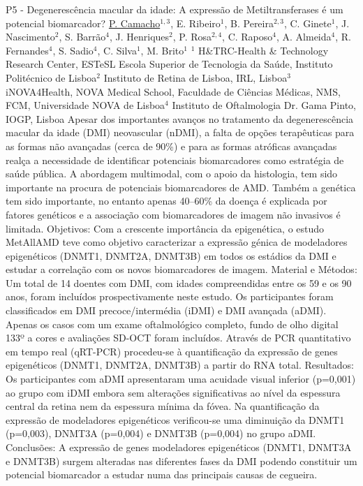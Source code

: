
    \begin{abstract_online}{P5 - Degenerescência macular da idade: A expressão de Metiltransferases é um potencial biomarcador?}{%
        \underline{P. Camacho}$^{1,3}$, E. Ribeiro$^{1}$, B. Pereira$^{2,3}$, C. Ginete$^{1}$, J. Nascimento$^{2}$, S. Barrão$^{4}$, J. Henriques$^{2}$, P. Rosa$^{2,4}$, C. Raposo$^{4}$, A. Almeida$^{4}$, R. Fernandes$^{4}$, S. Sadio$^{4}$, C. Silva$^{1}$, M. Brito$^{1}$}{%
        }{%
        $^1$ H\&TRC-Health \& Technology Research Center, ESTeSL Escola Superior de Tecnologia da Saúde, Instituto Politécnico de Lisboa\newline{}$^2$ Instituto de Retina de Lisboa, IRL, Lisboa\newline{}$^3$  iNOVA4Health, NOVA Medical School, Faculdade de Ciências Médicas, NMS, FCM, Universidade NOVA de Lisboa\newline{}$^4$ Instituto de Oftalmologia Dr. Gama Pinto, IOGP, Lisboa}
        Apesar dos importantes avanços no tratamento da degenerescência macular da idade (DMI) neovascular (nDMI), a falta de opções terapêuticas para as formas não avançadas (cerca de 90\%) e para as formas atróficas avançadas realça a necessidade de identificar potenciais biomarcadores como estratégia de saúde pública. A abordagem multimodal, com o apoio da histologia, tem sido importante na procura de potenciais biomarcadores de AMD. Também a genética tem sido importante, no entanto apenas 40–60\% da doença é explicada por fatores genéticos e a associação com biomarcadores de imagem não invasivos é limitada.\newline{}
Objetivos: Com a crescente importância da epigenética, o estudo MetAllAMD teve como objetivo caracterizar a expressão génica de modeladores epigenéticos (DNMT1, DNMT2A, DNMT3B) em todos os estádios da DMI e estudar a correlação com os novos biomarcadores de imagem.\newline{}
Material e Métodos: Um total de 14 doentes com DMI, com idades compreendidas entre os 59 e os 90 anos, foram incluídos prospectivamente neste estudo. Os participantes foram classificados em DMI precoce/intermédia (iDMI) e DMI avançada (aDMI). Apenas os casos com um exame oftalmológico completo, fundo de olho digital 133º a cores e avaliações SD-OCT foram incluídos. Através de PCR quantitativo em tempo real (qRT-PCR) procedeu-se à quantificação da expressão de genes epigenéticos (DNMT1, DNMT2A, DNMT3B) a partir do RNA total.\newline{}
Resultados: Os participantes com aDMI apresentaram uma acuidade visual inferior (p=0,001) ao grupo com iDMI embora sem alterações significativas ao nível da espessura central da retina nem da espessura mínima da fóvea. Na quantificação da expressão de modeladores epigenéticos verificou-se uma diminuição da DNMT1 (p=0,003), DNMT3A (p=0,004) e DNMT3B (p=0,004) no grupo aDMI.\newline{}
Conclusões: A expressão de genes modeladores epigenéticos (DNMT1, DNMT3A e DNMT3B) surgem alteradas nas diferentes fases da DMI podendo constituir um potencial biomarcador a estudar numa das principais causas de cegueira.
\end{abstract_online}
    